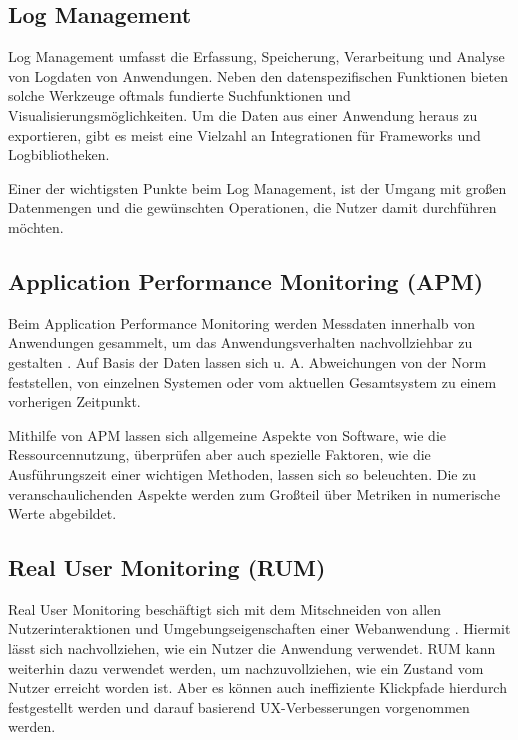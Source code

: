 \subsection{Log Management}

Log Management umfasst die Erfassung, Speicherung, Verarbeitung und Analyse von Logdaten von Anwendungen. Neben den datenspezifischen Funktionen bieten solche Werkzeuge oftmals fundierte Suchfunktionen und Visualisierungsmöglichkeiten. Um die Daten aus einer Anwendung heraus zu exportieren, gibt es meist eine Vielzahl an Integrationen für Frameworks und Logbibliotheken.

Einer der wichtigsten Punkte beim Log Management, ist der Umgang mit großen Datenmengen und die gewünschten Operationen, die Nutzer damit durchführen möchten.

\subsection{Application Performance Monitoring (APM)}

Beim Application Performance Monitoring werden Messdaten innerhalb von Anwendungen gesammelt, um das Anwendungsverhalten nachvollziehbar zu gestalten \cite{StudyingTheEffectivenessOfAPMTools}. Auf Basis der Daten lassen sich u. A. Abweichungen von der Norm feststellen, von einzelnen Systemen oder vom aktuellen Gesamtsystem zu einem vorherigen Zeitpunkt.

Mithilfe von APM lassen sich allgemeine Aspekte von Software, wie die Ressourcennutzung, überprüfen aber auch spezielle Faktoren, wie die Ausführungszeit einer wichtigen Methoden, lassen sich so beleuchten. Die zu veranschaulichenden Aspekte werden zum Großteil über Metriken in numerische Werte abgebildet.

\subsection{Real User Monitoring (RUM)}


Real User Monitoring beschäftigt sich mit dem Mitschneiden von allen Nutzerinteraktionen und Umgebungseigenschaften einer Webanwendung \cite{IdentifyingWebPerformanceDegradations}. Hiermit lässt sich nachvollziehen, wie ein Nutzer die Anwendung verwendet. RUM kann weiterhin dazu verwendet werden, um nachzuvollziehen, wie ein Zustand vom Nutzer erreicht worden ist. Aber es können auch ineffiziente Klickpfade hierdurch festgestellt werden und darauf basierend UX-Verbesserungen vorgenommen werden.

